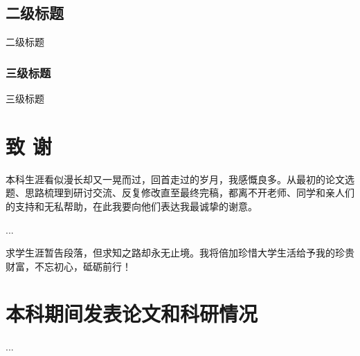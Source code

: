 \documentclass[openany,oneside]{book}
\theoremstyle{definition}
\begin{document}
	

	
	
	
	

\section{二级标题}

二级标题

\subsection{三级标题}

三级标题


\clearpage
{}
{}

\chapter*{致 \qquad 谢}
\thispagestyle{empty}
本科生涯看似漫长却又一晃而过，回首走过的岁月，我感慨良多。从最初的论文选题、思路梳理到研讨交流、反复修改直至最终完稿，都离不开老师、同学和亲人们的支持和无私帮助，在此我要向他们表达我最诚挚的谢意。

...

求学生涯暂告段落，但求知之路却永无止境。我将倍加珍惜大学生活给予我的珍贵财富，不忘初心，砥砺前行！
\chapter*{本科期间发表论文和科研情况}
\thispagestyle{empty}

...
\end{document}
